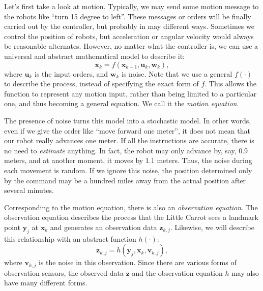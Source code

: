 Let's first take a look at motion. Typically, we may send some motion message to the robots like ``turn 15 degree to left''. These messages or orders will be finally carried out by the controller, but probably in may different ways. Sometimes we control the position of robots, but acceleration or angular velocity would always be reasonable alternates. However, no matter what the controller is, we can use a universal and abstract mathematical model to describe it:
\begin{equation}
{\mathbf{x}_k} = f\left( {{\mathbf{x}_{k - 1}},{\mathbf{u}_k}, \mathbf{w}_k} \right),
\end{equation}
where $\mathbf{u}_k$ is the input orders, and $\mathbf{w}_k$ is noise. Note that we use a general $f(\cdot)$ to describe the process, instead of specifying the exact form of $f$. This allows the function to represent any motion input, rather than being limited to a particular one, and thus becoming a general equation. We call it the \emph{motion equation}.

The presence of noise turns this model into a stochastic model. In other words, even if we give the order like ``move forward one meter'', it does not mean that our robot really advances one meter. If all the instructions are accurate, there is no need to \emph{estimate} anything. In fact, the robot may only advance by, say, 0.9 meters, and at another moment, it moves by 1.1 meters. Thus, the noise during each movement is random. If we ignore this noise, the position determined only by the command may be a hundred miles away from the actual position after several minutes.

Corresponding to the motion equation, there is also an \emph{observation equation}. The observation equation describes the process that the Little Carrot sees a landmark point $\mathbf{y}_j$ at $\mathbf{x}_k$ and generates an observation data $\mathbf{z}_{k,j}$. Likewise, we will describe this relationship with an abstract function $h(\cdot)$:
\begin{equation}
{\mathbf{z}_{k,j}} = h\left( {{\mathbf{y}_j},{\mathbf{x}_k}, \mathbf{v}_{k,j} } \right),
\end{equation}
where $\mathbf{v}_{k,j}$ is the noise in this observation. Since there are various forms of observation sensors, the observed data $\mathbf{z}$ and the observation equation $h$ may also have many different forms.

